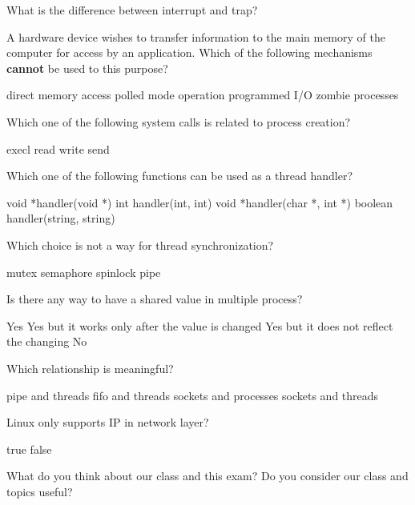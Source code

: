 \documentclass[12pt]{exam}
\begin{document}
\begin{questions}

\question[2] What is the difference between interrupt and trap?
\makeemptybox{\fill}
\addpoints

\newpage

\question[1] A hardware device wishes to transfer information to the main memory of the
computer for access by an application. Which of the following mechanisms \textbf{cannot} be used
to this purpose?
\begin{choices}
        \choice direct memory access
        \choice polled mode operation
        \choice programmed I/O
        \choice zombie processes
\end{choices}

\question[1] Which one of the following system calls is related to process creation?
\begin{choices}
        \choice execl
        \choice read
        \choice write
        \choice send
\end{choices}

\question[1] Which one of the following functions can be used as a thread handler?
\begin{choices}
        \choice void *handler(void *)
        \choice int handler(int, int)
        \choice void *handler(char *, int *)
        \choice boolean handler(string, string)
\end{choices}

\question[1] Which choice is not a way for thread synchronization?
\begin{choices}
        \choice mutex
        \choice semaphore
        \choice spinlock
        \choice pipe
\end{choices}

\question[1] Is there any way to have a shared value in multiple process?
\begin{choices}
        \choice Yes
        \choice Yes but it works only after the value is changed
        \choice Yes but it does not reflect the changing
        \choice No
\end{choices}

\question[1] Which relationship is meaningful?
\begin{choices}
        \choice pipe and threads
        \choice fifo and threads
        \choice sockets and processes
        \choice sockets and threads
\end{choices}

\question[1] Linux only supports IP in network layer?
\begin{choices}
        \choice true
        \choice false
\end{choices}

\question[0]
What do you think about our class and this exam? Do you consider our class and topics
useful?
\makeemptybox{2in}

\end{questions}
\end{document}
